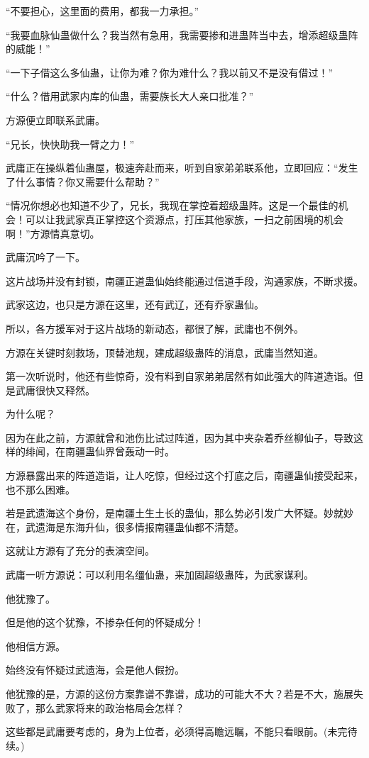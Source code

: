 \begin{this_body}
“不要担心，这里面的费用，都我一力承担。”

“我要血脉仙蛊做什么？我当然有急用，我需要掺和进蛊阵当中去，增添超级蛊阵的威能！”

“一下子借这么多仙蛊，让你为难？你为难什么？我以前又不是没有借过！”

“什么？借用武家内库的仙蛊，需要族长大人亲口批准？”

方源便立即联系武庸。

“兄长，快快助我一臂之力！”

武庸正在操纵着仙蛊屋，极速奔赴而来，听到自家弟弟联系他，立即回应：“发生了什么事情？你又需要什么帮助？”

“情况你想必也知道不少了，兄长，我现在掌控着超级蛊阵。这是一个最佳的机会！可以让我武家真正掌控这个资源点，打压其他家族，一扫之前困境的机会啊！”方源情真意切。

武庸沉吟了一下。

这片战场并没有封锁，南疆正道蛊仙始终能通过信道手段，沟通家族，不断求援。

武家这边，也只是方源在这里，还有武辽，还有乔家蛊仙。

所以，各方援军对于这片战场的新动态，都很了解，武庸也不例外。

方源在关键时刻救场，顶替池规，建成超级蛊阵的消息，武庸当然知道。

第一次听说时，他还有些惊奇，没有料到自家弟弟居然有如此强大的阵道造诣。但是武庸很快又释然。

为什么呢？

因为在此之前，方源就曾和池伤比试过阵道，因为其中夹杂着乔丝柳仙子，导致这样的绯闻，在南疆蛊仙界曾轰动一时。

方源暴露出来的阵道造诣，让人吃惊，但经过这个打底之后，南疆蛊仙接受起来，也不那么困难。

若是武遗海这个身份，是南疆土生土长的蛊仙，那么势必引发广大怀疑。妙就妙在，武遗海是东海升仙，很多情报南疆蛊仙都不清楚。

这就让方源有了充分的表演空间。

武庸一听方源说：可以利用名缰仙蛊，来加固超级蛊阵，为武家谋利。

他犹豫了。

但是他的这个犹豫，不掺杂任何的怀疑成分！

他相信方源。

始终没有怀疑过武遗海，会是他人假扮。

他犹豫的是，方源的这份方案靠谱不靠谱，成功的可能大不大？若是不大，施展失败了，那么武家将来的政治格局会怎样？

这些都是武庸要考虑的，身为上位者，必须得高瞻远瞩，不能只看眼前。(未完待续。)

\end{this_body}


